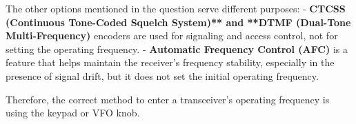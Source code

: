 The other options mentioned in the question serve different purposes:
- \textbf{CTCSS (Continuous Tone-Coded Squelch System)** and **DTMF (Dual-Tone Multi-Frequency)} encoders are used for signaling and access control, not for setting the operating frequency.
- \textbf{Automatic Frequency Control (AFC)} is a feature that helps maintain the receiver's frequency stability, especially in the presence of signal drift, but it does not set the initial operating frequency.

Therefore, the correct method to enter a transceiver’s operating frequency is using the keypad or VFO knob.

